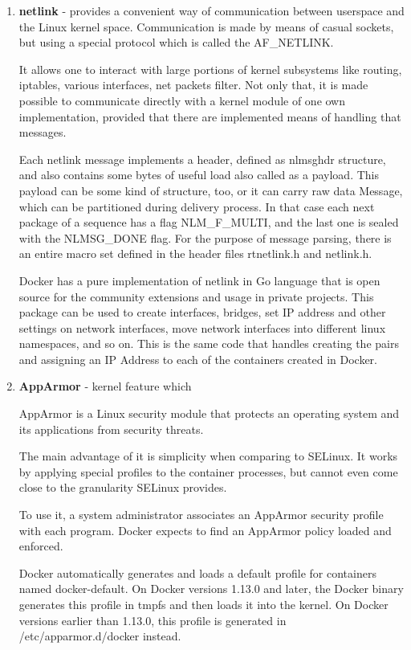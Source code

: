 \begin{enumerate}
\item \textbf{netlink} - provides a convenient way of communication
between userspace and the Linux kernel space.
Communication is made by means of casual sockets,
but using a special protocol which is called the AF\_NETLINK\cite{NetlinkOverview}.

It allows one to interact with large portions of kernel subsystems
like routing, iptables, various interfaces, net packets filter.
Not only that, it is made possible to communicate directly with a kernel
module of one own implementation, provided that
there are implemented means of handling that messages.

Each netlink message implements a header,
defined as nlmsghdr structure,
and also contains some bytes of useful load also called as a payload.
This payload can be some kind of structure, too, or it can carry raw data
Message, which can be partitioned during delivery process.
In that case each next package of a sequence has a flag NLM\_F\_MULTI,
and the last one is sealed with the NLMSG\_DONE flag.
For the purpose of message parsing, there is an entire macro set
defined in the header files rtnetlink.h and netlink.h\cite{NetlinkPacket}.

Docker has a pure implementation of netlink
in Go language that is open source for the community extensions
and usage in private projects.
This package can be used to create interfaces,
bridges, set IP address and other settings on network interfaces,
move network interfaces into different linux namespaces,
and so on.
This is the same code that handles creating the pairs and assigning
an IP Address to each of the containers created in Docker.

\item \textbf{AppArmor} - kernel feature which
\begin{definition}
AppArmor is a Linux security module
that protects an operating system and its applications from security threats.
\end{definition}

The main advantage of it is simplicity when comparing to SELinux.
It works by applying special profiles to the container processes,
but cannot even come close
to the granularity SELinux provides\cite{AdrMouAppArmor:2016}.

To use it, a system administrator associates an
AppArmor security profile with each program.
Docker expects to find an AppArmor policy loaded and enforced.

Docker automatically generates and loads a default profile for containers
named docker-default. On Docker versions 1.13.0 and later, the Docker
binary generates this profile in tmpfs and then loads it into the kernel.
On Docker versions earlier than 1.13.0, this
profile is generated in /etc/apparmor.d/docker instead.


\end{enumerate}
